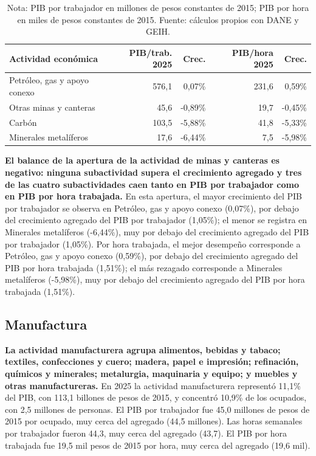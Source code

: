 \begin{table}[H]
\centering
\caption{Productividad laboral de las actividades mineras, 2010--2025}
\label{tab:sector_b_zoom61}
\small
\begin{tabular}{p{}rrrr}
\toprule
Actividad económica & PIB/trab. 2025 & Crec. & PIB/hora 2025 & Crec. \\
\midrule
Petróleo, gas y apoyo conexo & 576,1 & 0,07\% & 231,6 & 0,59\% \\
Otras minas y canteras & 45,6 & -0,89\% & 19,7 & -0,45\% \\
Carbón & 103,5 & -5,88\% & 41,8 & -5,33\% \\
Minerales metalíferos & 17,6 & -6,44\% & 7,5 & -5,98\% \\
\bottomrule
\end{tabular}
\caption*{\footnotesize Nota: PIB por trabajador en millones de pesos constantes de 2015; PIB por hora en miles de pesos constantes de 2015. %
Fuente: cálculos propios con DANE y GEIH.}
\end{table}

\textbf{El balance de la apertura de la actividad de minas y canteras es negativo: ninguna subactividad supera el crecimiento agregado y tres de las cuatro subactividades caen tanto en PIB por trabajador como en PIB por hora trabajada.} En esta apertura, el mayor crecimiento del PIB por trabajador se observa en Petróleo, gas y apoyo conexo (0,07\%), por debajo del crecimiento agregado del PIB por trabajador (1,05\%); el menor se registra en Minerales metalíferos (-6,44\%), muy por debajo del crecimiento agregado del PIB por trabajador (1,05\%). Por hora trabajada, el mejor desempeño corresponde a Petróleo, gas y apoyo conexo (0,59\%), por debajo del crecimiento agregado del PIB por hora trabajada (1,51\%); el más rezagado corresponde a Minerales metalíferos (-5,98\%), muy por debajo del crecimiento agregado del PIB por hora trabajada (1,51\%).

\subsection{Manufactura}

\textbf{La actividad manufacturera agrupa alimentos, bebidas y tabaco; textiles, confecciones y cuero; madera, papel e impresión; refinación, químicos y minerales; metalurgia, maquinaria y equipo; y muebles y otras manufactureras.} En 2025 la actividad manufacturera representó 11,1\% del PIB, con 113,1 billones de pesos de 2015, y concentró 10,9\% de los ocupados, con 2,5 millones de personas. El PIB por trabajador fue 45,0 millones de pesos de 2015 por ocupado, muy cerca del agregado (44,5 millones). Las horas semanales por trabajador fueron 44,3, muy cerca del agregado (43,7). El PIB por hora trabajada fue 19,5 mil pesos de 2015 por hora, muy cerca del agregado (19,6 mil).

